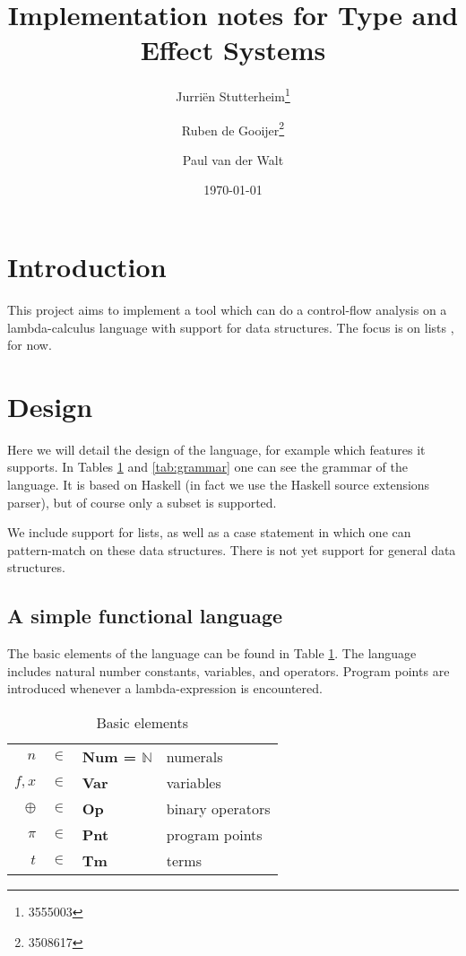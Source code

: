 \documentclass[a4paper]{article}
\author{Jurri\"en Stutterheim\footnote{3555003}\and Ruben de Gooijer\footnote{3508617}\and Paul van der Walt}
\date{\today}
\title{Implementation notes for Type and Effect Systems}
\begin{document}
\maketitle \tableofcontents

\section{Introduction}

This project aims to implement a tool which can do a control-flow analysis on a lambda-calculus language with support for
data structures. The focus is on lists%
, for now.

\section{Design}

Here we will detail the design of the language, for example which features it
supports. In Tables \ref{tab:elems} and \ref{tab:grammar} one can see the
grammar of the language. It is based on Haskell (in fact we use the Haskell
source extensions parser), but of course only a subset is supported. 

We include support for%
 lists, as well as a case statement in which one
can pattern-match on these data structures. There is not yet support for general
data structures.

\subsection{A simple functional language}


The basic elements of the language can be found in Table \ref{tab:elems}. The
language includes natural number constants, variables, and operators. Program
points are introduced whenever a lambda-expression is encountered.
\begin{table}
    \centering
    \begin{tabular}{rcll}
        $n$ &           $\in$ & \textbf{Num = $\mathds{N}$}& numerals \\
        $f,x$ &         $\in$ & \textbf{Var}               & variables \\
        $\oplus$ &      $\in$ & \textbf{Op}                & binary operators \\
        $\pi$ &         $\in$ & \textbf{Pnt}               & program points  \\
        $t$ &           $\in$ & \textbf{Tm}                & terms \\
    \end{tabular}
    \caption{Basic elements}
    \label{tab:elems}
\end{table}
\end{document}
